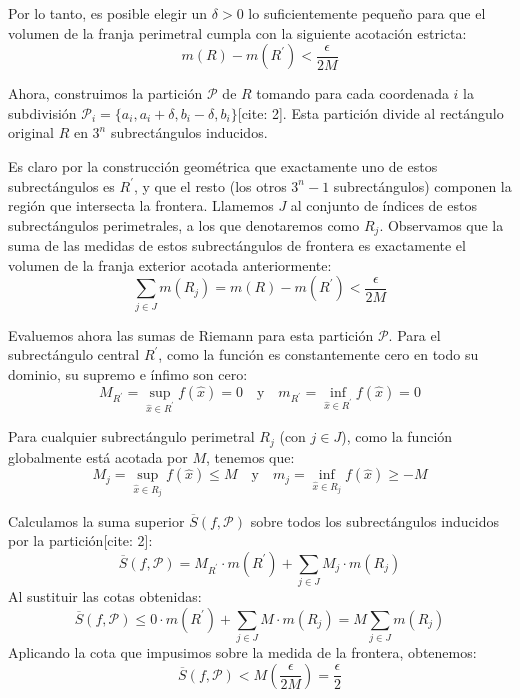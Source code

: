 \documentclass[11pt,letterpaper]{article}
\begin{document}
Por lo tanto, es posible elegir un $\delta > 0$ lo suficientemente pequeño para que el volumen de la franja perimetral cumpla con la siguiente acotación estricta:
\begin{equation*}
m(R) - m(R^{\prime}) < \frac{\epsilon}{2M}
\end{equation*}

Ahora, construimos la partición $\mathcal{P}$ de $R$ tomando para cada coordenada $i$ la subdivisión $\mathcal{P}_{i} = \{a_{i}, a_{i}+\delta, b_{i}-\delta, b_{i}\}$[cite: 2]. Esta partición divide al rectángulo original $R$ en $3^{n}$ subrectángulos inducidos. 

Es claro por la construcción geométrica que exactamente uno de estos subrectángulos es $R^{\prime}$, y que el resto (los otros $3^{n}-1$ subrectángulos) componen la región que intersecta la frontera. Llamemos $J$ al conjunto de índices de estos subrectángulos perimetrales, a los que denotaremos como $R_{j}$. Observamos que la suma de las medidas de estos subrectángulos de frontera es exactamente el volumen de la franja exterior acotada anteriormente:
\begin{equation*}
\sum_{j \in J} m(R_{j}) = m(R) - m(R^{\prime}) < \frac{\epsilon}{2M}
\end{equation*}

Evaluemos ahora las sumas de Riemann para esta partición $\mathcal{P}$.
Para el subrectángulo central $R^{\prime}$, como la función es constantemente cero en todo su dominio, su supremo e ínfimo son cero:
\begin{equation*}
M_{R^{\prime}} = \sup_{\hat{x} \in R^{\prime}} f(\hat{x}) = 0 \quad \text{y} \quad m_{R^{\prime}} = \inf_{\hat{x} \in R^{\prime}} f(\hat{x}) = 0
\end{equation*}

Para cualquier subrectángulo perimetral $R_{j}$ (con $j \in J$), como la función globalmente está acotada por $M$, tenemos que:
\begin{equation*}
M_{j} = \sup_{\hat{x} \in R_{j}} f(\hat{x}) \le M \quad \text{y} \quad m_{j} = \inf_{\hat{x} \in R_{j}} f(\hat{x}) \ge -M
\end{equation*}

Calculamos la suma superior $\overline{S}(f,\mathcal{P})$ sobre todos los subrectángulos inducidos por la partición[cite: 2]:
\begin{equation*}
\overline{S}(f,\mathcal{P}) = M_{R^{\prime}} \cdot m(R^{\prime}) + \sum_{j \in J} M_{j} \cdot m(R_{j})
\end{equation*}
Al sustituir las cotas obtenidas:
\begin{equation*}
\overline{S}(f,\mathcal{P}) \le 0 \cdot m(R^{\prime}) + \sum_{j \in J} M \cdot m(R_{j}) = M \sum_{j \in J} m(R_{j})
\end{equation*}
Aplicando la cota que impusimos sobre la medida de la frontera, obtenemos:
\begin{equation*}
\overline{S}(f,\mathcal{P}) < M \left( \frac{\epsilon}{2M} \right) = \frac{\epsilon}{2}
\end{equation*}
\end{document}
